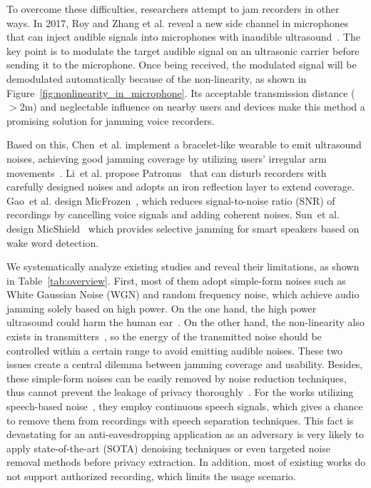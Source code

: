To overcome these difficulties, researchers attempt to jam recorders in other ways. 
In 2017, Roy and Zhang et al. reveal a new side channel in microphones that can inject audible signals into microphones with inaudible ultrasound~\cite{10.1145/3133956.3134052,backdoor}. The key point is to modulate the target audible signal on an ultrasonic carrier before sending it to the microphone. Once being received, the modulated signal will be demodulated automatically because of the non-linearity, as shown in Figure~\ref{fig:nonlinearity_in_microphone}. Its acceptable transmission distance ($>$2m) and neglectable influence on nearby users and devices make this method a promising solution for jamming voice recorders.

Based on this, Chen~et al. implement a bracelet-like wearable to emit ultrasound noises, achieving good jamming coverage by utilizing users' irregular arm movements~\cite{CHI}. Li~et al. propose Patronus~\cite{patronus} that can disturb recorders with carefully designed noises and adopts an iron reflection layer to extend coverage. Gao~et al. design MicFrozen~\cite{gao_cancelling_2023}, which reduces signal-to-noise ratio (SNR) of recordings by cancelling voice signals and adding coherent noises. Sun~et al. design MicShield~\cite{sun_alexa_2020} which provides selective jamming for smart speakers based on wake word detection.

We systematically analyze existing studies and reveal their limitations, as shown in Table~\ref{tab:overview}. First, most of them adopt simple-form noises such as White Gaussian Noise (WGN) and random frequency noise, which achieve audio jamming solely based on high power. On the one hand, the high power ultrasound could harm the human ear~\cite{human_ultrasound_tolerance}. On the other hand, the non-linearity also exists in transmitters~\cite{211283}, so the energy of the transmitted noise should be controlled within a certain range to avoid emitting audible noises. These two issues create a central dilemma between jamming coverage and usability. Besides, these simple-form noises can be easily removed by noise reduction techniques, thus cannot prevent the leakage of privacy thoroughly~\cite{Walker2021Evaluating}. For the works utilizing speech-based noise~\cite{gao_cancelling_2023}, they employ continuous speech signals, which gives a chance to remove them from recordings with speech separation techniques. This fact is devastating for an anti-eavesdropping application as an adversary is very likely to apply state-of-the-art (SOTA) denoising techniques or even targeted noise removal methods before privacy extraction. In addition, most of existing works do not support authorized recording, which limits the usage scenario.

